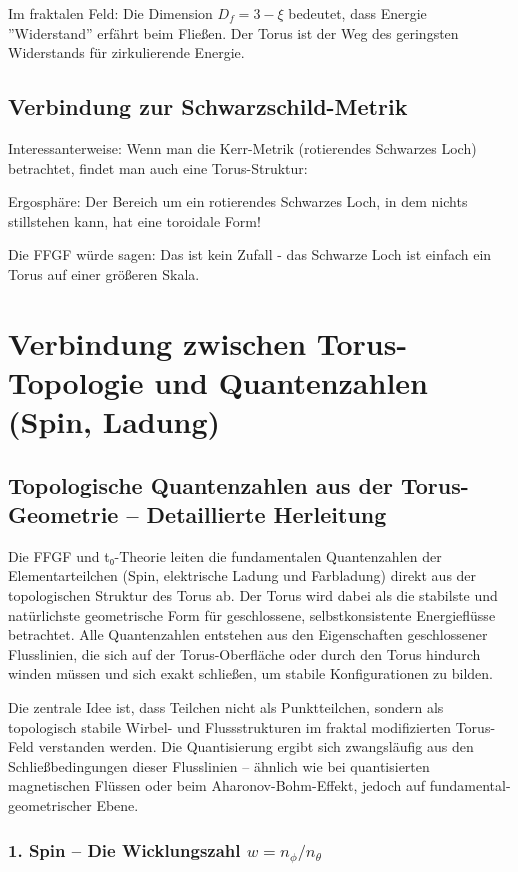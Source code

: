 \documentclass[12pt,a4paper]{article}
\begin{document}
	Im fraktalen Feld:
	Die Dimension \( D_f = 3 - \xi \) bedeutet, dass Energie ''Widerstand'' erfährt beim Fließen. Der Torus ist der Weg des geringsten Widerstands für zirkulierende Energie.
	
	\subsection{Verbindung zur Schwarzschild-Metrik}
	Interessanterweise: Wenn man die Kerr-Metrik (rotierendes Schwarzes Loch) betrachtet, findet man auch eine Torus-Struktur:
	
	Ergosphäre: Der Bereich um ein rotierendes Schwarzes Loch, in dem nichts stillstehen kann, hat eine toroidale Form!
	
	Die FFGF würde sagen: Das ist kein Zufall - das Schwarze Loch ist einfach ein Torus auf einer größeren Skala.
	
	\section{Verbindung zwischen Torus-Topologie und Quantenzahlen (Spin, Ladung)}
	
	\subsection{Topologische Quantenzahlen aus der Torus-Geometrie – Detaillierte Herleitung}
	
	Die FFGF und t₀-Theorie leiten die fundamentalen Quantenzahlen der Elementarteilchen (Spin, elektrische Ladung und Farbladung) direkt aus der topologischen Struktur des Torus ab. Der Torus wird dabei als die stabilste und natürlichste geometrische Form für geschlossene, selbstkonsistente Energieflüsse betrachtet. Alle Quantenzahlen entstehen aus den Eigenschaften geschlossener Flusslinien, die sich auf der Torus-Oberfläche oder durch den Torus hindurch winden müssen und sich exakt schließen, um stabile Konfigurationen zu bilden.
	
	Die zentrale Idee ist, dass Teilchen nicht als Punktteilchen, sondern als topologisch stabile Wirbel- und Flussstrukturen im fraktal modifizierten Torus-Feld verstanden werden. Die Quantisierung ergibt sich zwangsläufig aus den Schließbedingungen dieser Flusslinien – ähnlich wie bei quantisierten magnetischen Flüssen oder beim Aharonov-Bohm-Effekt, jedoch auf fundamental-geometrischer Ebene.
	
	\subsubsection{1. Spin – Die Wicklungszahl $w = n_\phi / n_\theta$}
	
\end{document}
